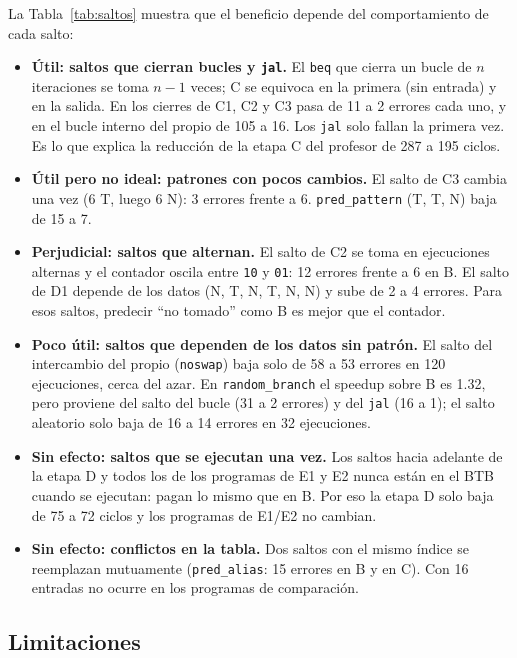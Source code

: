 \documentclass[12pt,a4paper]{article}
\begin{document}
La Tabla~\ref{tab:saltos} muestra que el beneficio depende del comportamiento de cada salto:
\begin{itemize}
    \item \textbf{Útil: saltos que cierran bucles y \texttt{jal}.} El \texttt{beq} que cierra un bucle de $n$ iteraciones se toma $n-1$ veces; C se equivoca en la primera (sin entrada) y en la salida. En los cierres de C1, C2 y C3 pasa de 11 a 2 errores cada uno, y en el bucle interno del propio de 105 a 16. Los \texttt{jal} solo fallan la primera vez. Es lo que explica la reducción de la etapa C del profesor de 287 a 195 ciclos.
    \item \textbf{Útil pero no ideal: patrones con pocos cambios.} El salto de C3 cambia una vez (6 T, luego 6 N): 3 errores frente a 6. \texttt{pred\_pattern} (T, T, N) baja de 15 a 7.
    \item \textbf{Perjudicial: saltos que alternan.} El salto de C2 se toma en ejecuciones alternas y el contador oscila entre \texttt{10} y \texttt{01}: 12 errores frente a 6 en B. El salto de D1 depende de los datos (N, T, N, T, N, N) y sube de 2 a 4 errores. Para esos saltos, predecir ``no tomado'' como B es mejor que el contador.
    \item \textbf{Poco útil: saltos que dependen de los datos sin patrón.} El salto del intercambio del propio (\texttt{noswap}) baja solo de 58 a 53 errores en 120 ejecuciones, cerca del azar. En \texttt{random\_branch} el speedup sobre B es 1.32, pero proviene del salto del bucle (31 a 2 errores) y del \texttt{jal} (16 a 1); el salto aleatorio solo baja de 16 a 14 errores en 32 ejecuciones.
    \item \textbf{Sin efecto: saltos que se ejecutan una vez.} Los saltos hacia adelante de la etapa D y todos los de los programas de E1 y E2 nunca están en el BTB cuando se ejecutan: pagan lo mismo que en B. Por eso la etapa D solo baja de 75 a 72 ciclos y los programas de E1/E2 no cambian.
    \item \textbf{Sin efecto: conflictos en la tabla.} Dos saltos con el mismo índice se reemplazan mutuamente (\texttt{pred\_alias}: 15 errores en B y en C). Con 16 entradas no ocurre en los programas de comparación.
\end{itemize}

\subsection{Limitaciones}
\label{sec:limit}
\end{document}

